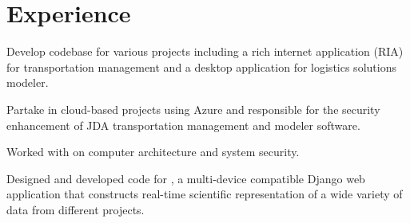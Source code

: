\documentclass[]{deedy_format_Hien}
\begin{document}
\hfill
\begin{minipage}[t]{0.66\textwidth} 
%
%


\section{Experience}
\vspace{3mm}
\justify
\begin{tightemize}
\item Develop codebase for various projects including a rich internet application (RIA) for transportation management and a desktop application for logistics solutions modeler.  
\item Partake in cloud-based projects using Azure and responsible for the security enhancement of JDA transportation management and modeler software.  
\end{tightemize}
\vspace{\topsep}
\sectionsep

\justify
\begin{tightemize}
\item Worked with  on computer architecture and system security.
\end{tightemize}
\vspace{\topsep}
\sectionsep

\justify
\begin{tightemize}
\item Designed and developed  code for , a multi-device compatible Django web application that constructs real-time scientific representation of a wide variety of data from different projects.
\end{tightemize}
\vspace{\topsep}
\sectionsep


\end{minipage}
\end{document}
